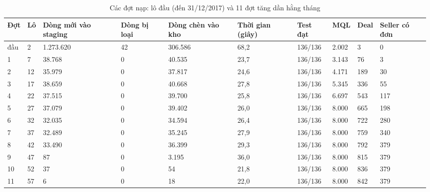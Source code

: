 \begin{table}[htbp]\centering\tiny\caption{Các đợt nạp: lô đầu (đến 31/12/2017) và 11 đợt tăng dần hằng tháng}\label{tab:etl-batches}
\begin{tabular}{p{0.88cm}p{0.88cm}p{1.56cm}p{1.07cm}p{1.46cm}p{1.36cm}p{1.17cm}p{0.97cm}p{0.88cm}p{1.27cm}}\toprule
\textbf{Đợt} & \textbf{Lô} & \textbf{Dòng mới vào staging} & \textbf{Dòng bị loại} & \textbf{Dòng chèn vào kho} & \textbf{Thời gian (giây)} & \textbf{Test đạt} & \textbf{MQL} & \textbf{Deal} & \textbf{Seller có đơn}\\\midrule
đầu & 2 & 1.273.620 & 42 & 306.586 & 68,2 & 136/136 & 2.002 & 3 & 0\\
1 & 7 & 38.768 & 0 & 40.535 & 23,7 & 136/136 & 3.143 & 76 & 3\\
2 & 12 & 35.979 & 0 & 37.817 & 24,6 & 136/136 & 4.171 & 189 & 30\\
3 & 17 & 38.659 & 0 & 40.668 & 27,8 & 136/136 & 5.345 & 336 & 55\\
4 & 22 & 37.515 & 0 & 39.700 & 25,8 & 136/136 & 6.697 & 543 & 117\\
5 & 27 & 37.079 & 0 & 39.402 & 26,0 & 136/136 & 8.000 & 665 & 198\\
6 & 32 & 32.035 & 0 & 34.594 & 26,4 & 136/136 & 8.000 & 722 & 280\\
7 & 37 & 32.489 & 0 & 35.245 & 27,9 & 136/136 & 8.000 & 759 & 340\\
8 & 42 & 33.490 & 0 & 36.399 & 29,3 & 136/136 & 8.000 & 792 & 379\\
9 & 47 & 87 & 0 & 3.195 & 36,0 & 136/136 & 8.000 & 815 & 379\\
10 & 52 & 37 & 0 & 54 & 21,8 & 136/136 & 8.000 & 836 & 379\\
11 & 57 & 6 & 0 & 18 & 22,0 & 136/136 & 8.000 & 842 & 379\\
\bottomrule\end{tabular}\end{table}
